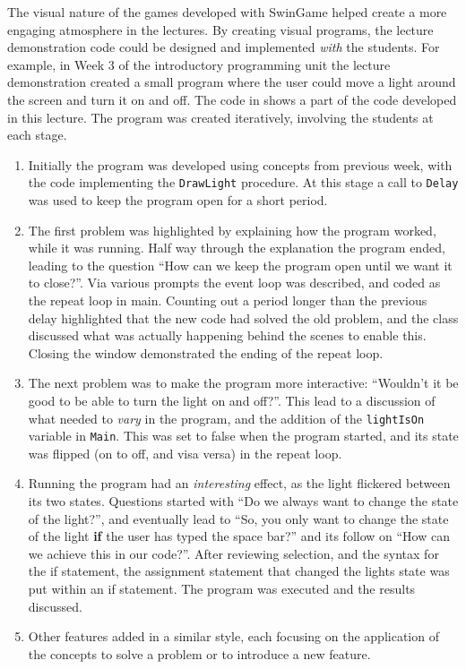 The visual nature of the games developed with SwinGame helped create a more engaging atmosphere in the lectures. By creating visual programs, the lecture demonstration code could be designed and implemented \emph{with} the students. For example, in Week 3 of the introductory programming unit the lecture demonstration created a small program where the user could move a light around the screen and turn it on and off. The code in  shows a part of the code developed in this lecture. The program was created iteratively, involving the students at each stage.

\begin{enumerate}
  \item Initially the program was developed using concepts from previous week, with the code implementing the \texttt{DrawLight} procedure. At this stage a call to \texttt{Delay} was used to keep the program open for a short period.
  \item The first problem was highlighted by explaining how the program worked, while it was running. Half way through the explanation the program ended, leading to the question ``How can we keep the program open until we want it to close?''. Via various prompts the event loop was described, and coded as the repeat loop in main. Counting out a period longer than the previous delay highlighted that the new code had solved the old problem, and the class discussed what was actually happening behind the scenes to enable this. Closing the window demonstrated the ending of the repeat loop.
  \item The next problem was to make the program more interactive: ``Wouldn't it be good to be able to turn the light on and off?''. This lead to a discussion of what needed to \emph{vary} in the program, and the addition of the \texttt{lightIsOn} variable in \texttt{Main}. This was set to false when the program started, and its state was flipped (on to off, and visa versa) in the repeat loop.
  \item Running the program had an \emph{interesting} effect, as the light flickered between its two states. Questions started with ``Do we always want to change the state of the light?'', and eventually lead to ``So, you only want to change the state of the light \textbf{if} the user has typed the space bar?'' and its follow on ``How can we achieve this in our code?''. After reviewing selection, and the syntax for the if statement, the assignment statement that changed the lights state was put within an if statement. The program was executed and the results discussed.
  \item Other features added in a similar style, each focusing on the application of the concepts to solve a problem or to introduce a new feature.  
\end{enumerate}


